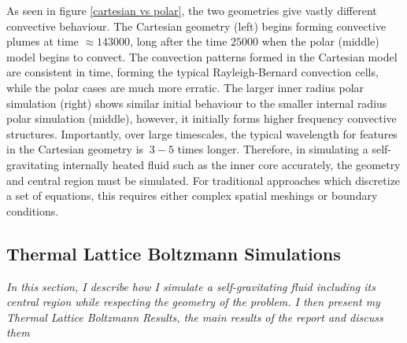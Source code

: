 \documentclass{article}
\begin{document}
\noindent As seen in figure \ref{cartesian vs polar}, the two geometries give vastly different convective behaviour. The Cartesian geometry (left) begins forming 
convective plumes at time $\approx 143000$, long after the time $25000$ when the polar (middle) model begins to convect. The convection patterns formed 
in the Cartesian model are consistent in time, forming the typical Rayleigh-Bernard convection cells, while the polar cases are much more erratic. The larger inner radius polar simulation (right) shows similar initial behaviour to the smaller internal radius polar simulation (middle), however, it initially forms higher frequency convective structures. Importantly, over large timescales, the typical wavelength for features in the Cartesian geometry is $~3-5$ times longer. Therefore, in simulating a self-gravitating internally heated fluid such as the inner core accurately, the geometry and central region must be simulated. For traditional approaches which discretize a set of equations, this requires either complex spatial meshings or boundary conditions. 




\subsection*{Thermal Lattice Boltzmann Simulations}
{\it{In this section, I describe how I simulate a self-gravitating fluid including its central region while respecting the geometry of the problem. I then present my Thermal Lattice Boltzmann Results, the main results of the report and discuss them}}
\vspace{0.3cm}
\newline
\end{document}
